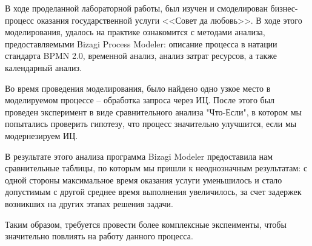 \Conclusion %

В ходе проделанной лабораторной работы, был изучен и
смоделирован бизнес-процесс оказания государственной
услуги <<Совет да любовь>>. В ходе этого моделирования,
удалось на практике ознакомится с методами анализа,
предоставляемыми Bizagi Process Modeler: описание
процесса в натации стандарта BPMN 2.0, временной анализ,
анализ затрат ресурсов, а также календарный анализ.

Во время проведения моделирования, было найдено одно
узкое место в моделируемом процессе -- обработка запроса
через ИЦ. После этого был проведен эксперимент в виде
сравнительного анализа "Что-Если", в котором мы
попытались проверить гипотезу, что процесс значительно
улучшится, если мы модернезируем ИЦ.

В результате этого анализа программа Bizagi Modeler
предоставила нам сравнительные таблицы, по которым мы пришли
к неоднозначным результатам: с одной стороны максимальное
время оказания услуги уменьшилось и стало допустимым с другой
среднее время выполнения увеличилось, за счет задержек
возникших на других этапах решения задачи.

Таким образом, требуется провести более комплексные экспеименты,
чтобы значительно повлиять на работу данного процесса.




